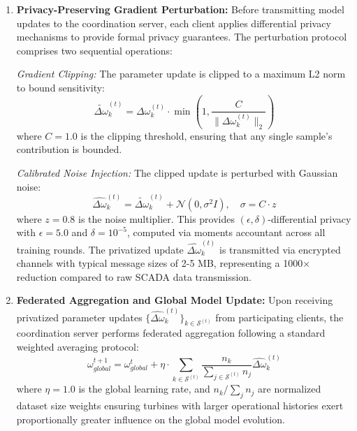 \documentclass[12pt]{article}
\begin{document}
\begin{enumerate}
    \item \textbf{Privacy-Preserving Gradient Perturbation:} 
    Before transmitting model updates to the coordination server, each client applies differential privacy mechanisms to provide formal privacy guarantees. The perturbation protocol comprises two sequential operations:
    
    \textit{Gradient Clipping:} The parameter update is clipped to a maximum L2 norm to bound sensitivity:
    \begin{equation}
    \tilde{\Delta\omega}_k^{(t)} = \Delta\omega_k^{(t)} \cdot \min\left(1, \frac{C}{\|\Delta\omega_k^{(t)}\|_2}\right)
    \label{eq:gradient_clipping}
    \end{equation}
    where $C = 1.0$ is the clipping threshold, ensuring that any single sample's contribution is bounded.
    
    \textit{Calibrated Noise Injection:} The clipped update is perturbed with Gaussian noise:
    \begin{equation}
    \hat{\Delta\omega}_k^{(t)} = \tilde{\Delta\omega}_k^{(t)} + \mathcal{N}\left(0, \sigma^2 I\right), \quad \sigma = C \cdot z
    \label{eq:noise_injection}
    \end{equation}
    where $z = 0.8$ is the noise multiplier. This provides $(\epsilon, \delta)$-differential privacy with $\epsilon = 5.0$ and $\delta = 10^{-5}$, computed via moments accountant across all training rounds. The privatized update $\hat{\Delta\omega}_k^{(t)}$ is transmitted via encrypted channels with typical message sizes of 2-5 MB, representing a 1000$\times$ reduction compared to raw SCADA data transmission.
    
    \item \textbf{Federated Aggregation and Global Model Update:} 
    Upon receiving privatized parameter updates $\{\hat{\Delta\omega}_k^{(t)}\}_{k \in \mathcal{S}^{(t)}}$ from participating clients, the coordination server performs federated aggregation following a standard weighted averaging protocol:
    \begin{equation}
    \omega_{global}^{t+1} = \omega_{global}^{t} + \eta \cdot \sum_{k \in \mathcal{S}^{(t)}} \frac{n_k}{\sum_{j \in \mathcal{S}^{(t)}} n_j} \hat{\Delta\omega}_k^{(t)}
    \label{eq:federated_aggregation}
    \end{equation}
    where $\eta = 1.0$ is the global learning rate, and $n_k / \sum_j n_j$ are normalized dataset size weights ensuring turbines with larger operational histories exert proportionally greater influence on the global model evolution.
    

\end{enumerate}
\end{document}
